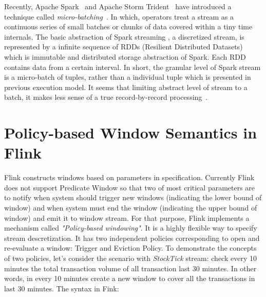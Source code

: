 

Recently, Apache Spark~\citep{spark} and Apache Storm Trident~\citep{storm} have introduced a technique called \textit{micro-batching}~\citep{Zaharia:2012}. In which, operators treat a stream as a continuous series of small batches or chunks of data covered within a tiny time internals. The basic abstraction of Spark streaming , a discretized stream,  is represented by a infinite sequence of RDDs (Resilient Distributed Datasets) which is immutable and distributed storage abstraction of Spark. Each RDD contains data from a certain interval. In short, the granular level of Spark stream is a micro-batch of tuples, rather than a individual tuple which is presented in previous execution model. It seems that limiting abstract level of stream to a batch, it makes less sense of a true record-by-record processing~\citep{Shahrivari:2014}.




\section{Policy-based Window Semantics in Flink}


Flink constructs windows based on parameters in specification. Currently Flink does not support Predicate Window so that two of most critical parameters are to notify when system should trigger new windows (indicating the lower bound of window) and when system must end the window (indicating the upper bound of window) and emit it to window stream. For that purpose, Flink implements a mechanism called \textit{"Policy-based windowing"}. It is a highly flexible way to specify stream descretization. It has two independent policies corresponding to open and re-evaluate a window: Trigger and Eviction Policy.
To demonstrate the concepts of two policies, let's consider the scenario with \textit{StockTick} stream: check every 10 minutes the total transaction volume of all transaction last 30 minutes. In other words, in every 10 minutes create a new window to cover all the transactions in last 30 minutes. The syntax in Fink:

